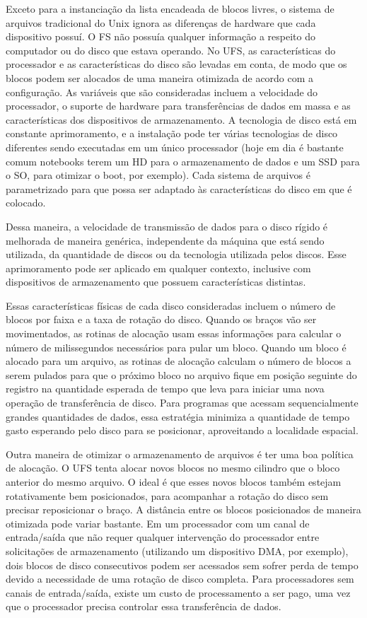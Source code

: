 Exceto para a instanciação da lista encadeada de blocos livres, o sistema de arquivos tradicional do Unix ignora as diferenças de hardware que cada dispositivo possuí. O FS não possuía qualquer informação a respeito do computador ou do disco que estava operando. No UFS, as características do processador e as características do disco são levadas em conta, de modo que os blocos podem ser alocados de uma maneira otimizada de acordo com a configuração. As variáveis que são consideradas incluem a velocidade do processador, o suporte de hardware para transferências de dados em massa e as características dos dispositivos de armazenamento. A tecnologia de disco está em constante aprimoramento, e a instalação pode ter várias tecnologias de disco diferentes sendo executadas em um único processador (hoje em dia é bastante comum notebooks terem um HD para o armazenamento de dados e um SSD para o SO, para otimizar o boot, por exemplo). Cada sistema de arquivos é parametrizado para que possa ser adaptado às características do disco em que é colocado.

Dessa maneira, a velocidade de transmissão de dados para o disco rígido é melhorada de maneira genérica, independente da máquina que está sendo utilizada, da quantidade de discos ou da tecnologia utilizada pelos discos. Esse aprimoramento pode ser aplicado em qualquer contexto, inclusive com dispositivos de armazenamento que possuem características distintas.

Essas características físicas de cada disco consideradas incluem o número de blocos por faixa e a taxa de rotação do disco. Quando os braços vão ser movimentados, as rotinas de alocação usam essas informações para calcular o número de milissegundos necessários para pular um bloco. Quando um bloco é alocado para um arquivo, as rotinas de alocação calculam o número de blocos a serem pulados para que o próximo bloco no arquivo fique em posição seguinte do registro na quantidade esperada de tempo que leva para iniciar uma nova operação de transferência de disco. Para programas que acessam sequencialmente grandes quantidades de dados, essa estratégia minimiza a quantidade de tempo gasto esperando pelo disco para se posicionar, aproveitando a localidade espacial.

Outra maneira de otimizar o armazenamento de arquivos é ter uma boa política de alocação. O UFS tenta alocar novos blocos no mesmo cilindro que o bloco anterior do mesmo arquivo. O ideal é que esses novos blocos também estejam rotativamente bem posicionados, para acompanhar a rotação do disco sem precisar reposicionar o braço. A distância entre os blocos posicionados de maneira otimizada pode variar bastante. Em um processador com um canal de entrada/saída que não requer qualquer intervenção do processador entre solicitações de armazenamento (utilizando um dispositivo DMA, por exemplo), dois blocos de disco consecutivos podem ser acessados sem sofrer perda de tempo devido a necessidade de uma rotação de disco completa. Para processadores sem canais de entrada/saída, existe um custo de processamento a ser pago, uma vez que o processador precisa controlar essa transferência de dados.

